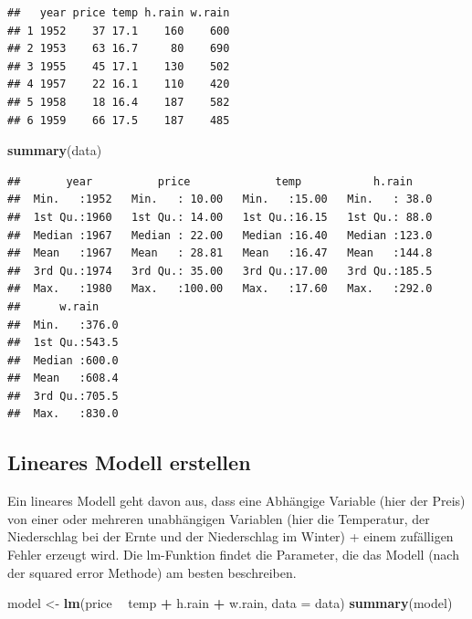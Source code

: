 \documentclass[]{article}
\newenvironment{Shaded}{\begin{snugshade}}{\end{snugshade}}
\newcommand{\DataTypeTok}[1]{\textcolor[rgb]{0.13,0.29,0.53}{#1}}
\newcommand{\KeywordTok}[1]{\textcolor[rgb]{0.13,0.29,0.53}{\textbf{#1}}}
\newcommand{\NormalTok}[1]{#1}
\newcommand{\OperatorTok}[1]{\textcolor[rgb]{0.81,0.36,0.00}{\textbf{#1}}}
\newcommand{\StringTok}[1]{\textcolor[rgb]{0.31,0.60,0.02}{#1}}
\begin{document}
\begin{verbatim}
##   year price temp h.rain w.rain
## 1 1952    37 17.1    160    600
## 2 1953    63 16.7     80    690
## 3 1955    45 17.1    130    502
## 4 1957    22 16.1    110    420
## 5 1958    18 16.4    187    582
## 6 1959    66 17.5    187    485
\end{verbatim}

\begin{Shaded}
\begin{Highlighting}[]
\KeywordTok{summary}\NormalTok{(data)}
\end{Highlighting}
\end{Shaded}

\begin{verbatim}
##       year          price             temp           h.rain     
##  Min.   :1952   Min.   : 10.00   Min.   :15.00   Min.   : 38.0  
##  1st Qu.:1960   1st Qu.: 14.00   1st Qu.:16.15   1st Qu.: 88.0  
##  Median :1967   Median : 22.00   Median :16.40   Median :123.0  
##  Mean   :1967   Mean   : 28.81   Mean   :16.47   Mean   :144.8  
##  3rd Qu.:1974   3rd Qu.: 35.00   3rd Qu.:17.00   3rd Qu.:185.5  
##  Max.   :1980   Max.   :100.00   Max.   :17.60   Max.   :292.0  
##      w.rain     
##  Min.   :376.0  
##  1st Qu.:543.5  
##  Median :600.0  
##  Mean   :608.4  
##  3rd Qu.:705.5  
##  Max.   :830.0
\end{verbatim}

\hypertarget{lineares-modell-erstellen}{%
\subsection{Lineares Modell erstellen}\label{lineares-modell-erstellen}}

Ein lineares Modell geht davon aus, dass eine Abhängige Variable (hier der Preis) von einer oder mehreren
unabhängigen Variablen (hier die Temperatur, der Niederschlag bei der Ernte und der Niederschlag im Winter) +
einem zufälligen Fehler erzeugt wird. Die lm-Funktion findet die Parameter, die das Modell
(nach der squared error Methode) am besten beschreiben.

\begin{Shaded}
\begin{Highlighting}[]
\NormalTok{model <-}\StringTok{ }\KeywordTok{lm}\NormalTok{(price }\OperatorTok{~}\StringTok{ }\NormalTok{temp }\OperatorTok{+}\StringTok{ }\NormalTok{h.rain }\OperatorTok{+}\StringTok{ }\NormalTok{w.rain, }\DataTypeTok{data =}\NormalTok{ data)}
\KeywordTok{summary}\NormalTok{(model)}
\end{Highlighting}
\end{Shaded}
\end{document}
